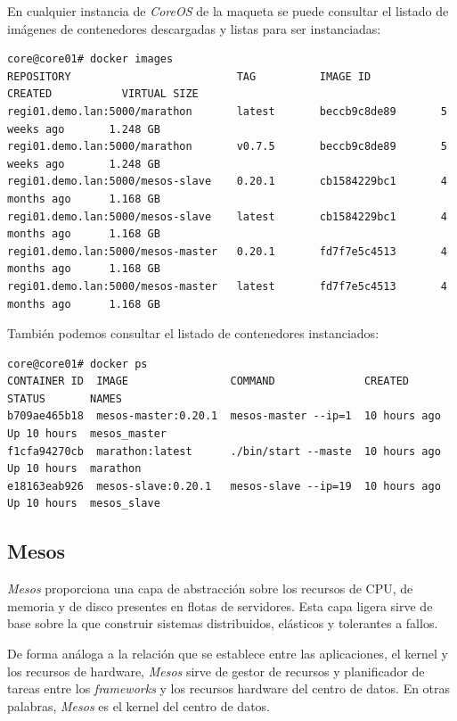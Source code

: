 \documentclass[a4paper,12pt,spanish,final]{epsc_tfc_pfc}
\begin{document}
En cualquier instancia de \emph{CoreOS} de la maqueta se puede consultar el listado de imágenes de contenedores descargadas y listas para ser instanciadas:\\

\begin{lstlisting}[style=dnsmasq]
core@core01# docker images
REPOSITORY                          TAG          IMAGE ID           CREATED           VIRTUAL SIZE
regi01.demo.lan:5000/marathon       latest       beccb9c8de89       5 weeks ago       1.248 GB
regi01.demo.lan:5000/marathon       v0.7.5       beccb9c8de89       5 weeks ago       1.248 GB
regi01.demo.lan:5000/mesos-slave    0.20.1       cb1584229bc1       4 months ago      1.168 GB
regi01.demo.lan:5000/mesos-slave    latest       cb1584229bc1       4 months ago      1.168 GB
regi01.demo.lan:5000/mesos-master   0.20.1       fd7f7e5c4513       4 months ago      1.168 GB
regi01.demo.lan:5000/mesos-master   latest       fd7f7e5c4513       4 months ago      1.168 GB
\end{lstlisting}

También podemos consultar el listado de contenedores instanciados:\\

\begin{lstlisting}[style=dnsmasq]
core@core01# docker ps
CONTAINER ID  IMAGE                COMMAND              CREATED        STATUS       NAMES
b709ae465b18  mesos-master:0.20.1  mesos-master --ip=1  10 hours ago   Up 10 hours  mesos_master
f1cfa94270cb  marathon:latest      ./bin/start --maste  10 hours ago   Up 10 hours  marathon
e18163eab926  mesos-slave:0.20.1   mesos-slave --ip=19  10 hours ago   Up 10 hours  mesos_slave
\end{lstlisting}

\subsection{Mesos}

\emph{Mesos} proporciona una capa de abstracción sobre los recursos de CPU, de memoria y de disco presentes en flotas de servidores. Esta capa ligera sirve de base sobre la que construir sistemas distribuidos, elásticos y tolerantes a fallos.

De forma análoga a la relación que se establece entre las aplicaciones, el kernel y los recursos de hardware, \emph{Mesos} sirve de gestor de recursos y planificador de tareas entre los \emph{frameworks} y los recursos hardware del centro de datos. En otras palabras, \emph{Mesos} es el kernel del centro de datos.
\end{document}
